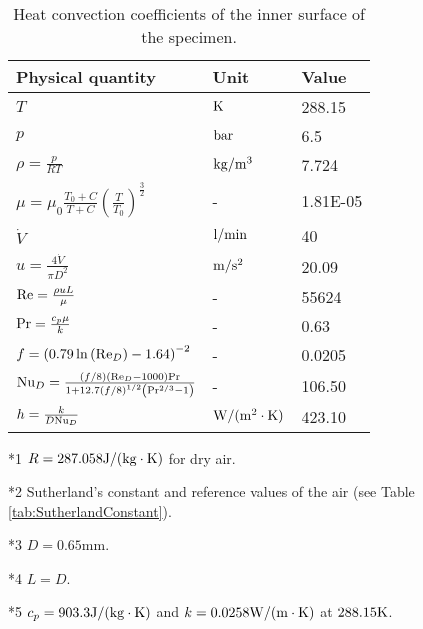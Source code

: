 \begin{table}[htbp]
  \begin{threeparttable}
  \centering
  \caption{Heat convection coefficients of the inner surface of the specimen.}
    \begin{tabular}{p{6cm}p{2.5cm}p{2.5cm}}
    \toprule
    Physical quantity   & Unit & Value  \\
    \midrule
    $T$   & ${\rm{K}}$ & 288.15  \\
    $p$   & ${\rm{bar}}$ & 6.5   \\
    $\rho  = \frac{p}{{RT}}$ \tnote{*1} & ${\rm{kg/}}{{\rm{m}}^{\rm{3}}}$ & 7.724 \\
    $\mu  = {\mu _0}\frac{{{T_0} + C}}{{T + C}}{\left( {\frac{T}{{{T_0}}}} \right)^{\frac{3}{2}}}$ \tnote{*2} & -     & 1.81E-05 \\
    ${\dot V}$ & ${\rm{l/min}}$ & 40  \\
    $u = \frac{{4\dot V}}{{\pi {D^2}}}$ \tnote{*3} & ${\rm{m/}}{{\rm{s}}^2}$ & 20.09  \\
    ${\rm{Re}} = \frac{{\rho uL}}{\mu }$ \tnote{*4} & -     & 55624  \\
    ${\rm{Pr}} = \frac{{{c_p}\mu }}{k}$ \tnote{*5} & -     & 0.63  \\
    $f = {\left( {0.79\ln \left( {{\rm{R}}{{\rm{e}}_D}} \right) - 1.64} \right)^{ - 2}}$ & -     & 0.0205  \\
    ${\rm{N}}{{\rm{u}}_D} = \frac{{\left( {f/8} \right)\left( {{\rm{R}}{{\rm{e}}_D} - 1000} \right){\rm{Pr}}}}{{1 + 12.7{{(f/8)}^{1/2}}\left( {{\rm{P}}{{\rm{r}}^{2/3}} - 1} \right)}}$ & -     & 106.50  \\
    $h = \frac{k}{{D{\rm{N}}{{\rm{u}}_D}}}$ & ${\rm{W/(}}{{\rm{m}}^{\rm{2}}} \cdot {\rm{K)}}$ & 423.10  \\
    \bottomrule
    \end{tabular}%
    \begin{tablenotes}
    \item[*1] $R = 287.058 {\rm{J/(kg}} \cdot {\rm{K}})$ for dry air.
    \item[*2] Sutherland's constant and reference values of the air (see Table \ref{tab:SutherlandConstant}).
    \item[*3] $D=0.65$mm.
    \item[*4] $L=D$.
    \item[*5] $c_{p}=903.3 {\rm{J/(kg}} \cdot {\rm{K}})$ and $k=0.0258 {\rm{W/(m}} \cdot {\rm{K}})$ at $288.15{\rm{K}}$.
    \end{tablenotes}
    \end{threeparttable}
  \label{tab:addlabel}%
\end{table}%

